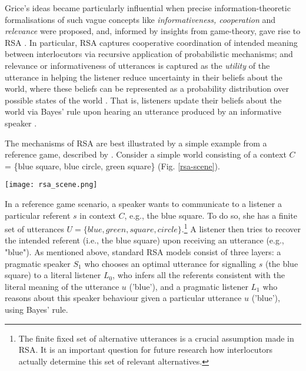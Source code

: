 Grice’s ideas became particularly influential when precise information-theoretic formalisations of such vague concepts like \emph{informativeness, cooperation} and \emph{relevance} were proposed, and, informed by insights from game-theory, gave rise to RSA \parencite{frank2012predicting}.
In particular, RSA captures cooperative coordination of intended meaning between interlocutors via recursive application of probabilistic mechanisms; and relevance or informativeness of utterances is captured as the \emph{utility} of the utterance in helping the listener reduce uncertainty in their beliefs about the world, where these beliefs can be represented as a probability distribution over possible states of the world \parencite[as advocated by e.g.][]{tenenbaum2011grow}.  
That is, listeners update their beliefs about the world via Bayes' rule upon hearing an utterance produced by an informative speaker \parencite{frank2012predicting}.

The mechanisms of RSA are best illustrated by a simple example from a reference game, described by \textcite{frank2012predicting}.
Consider a simple world consisting of a context $C$ = \{blue square, blue circle, green square\} (Fig. \ref{rsa-scene}).
\begin{figure*}[t]
	\begin{center}
		\texttt{[image: rsa\_scene.png]}
	\end{center}
	\vspace{-0.3cm}
	\caption{A simple reference resolution example scenario: the context $C$ consists of three possible referents \parencite{frank2012predicting}}
	\label{rsa-scene}
\end{figure*}
In a reference game scenario, a speaker wants to communicate to a listener a particular referent $s$ in context $C$, e.g., the blue square. To do so, she has a finite set of utterances $U = \{blue, green, square, circle\}$.\footnote{The finite fixed set of alternative utterances is a crucial assumption made in RSA. It is an important question for future research how interlocutors actually determine this set of relevant alternatives.} A listener then tries to recover the intended referent (i.e., the blue square) upon receiving an utterance (e.g., "blue"). 
As mentioned above, standard RSA models consist of three layers: a pragmatic speaker $S_1$ who chooses an optimal utterance for signalling $s$ (the blue square) to a literal listener $L_0$, who infers all the referents consistent with the literal meaning of the utterance $u$ ('blue'), and a pragmatic listener $L_1$ who reasons about this speaker behaviour given a particular utterance $u$ ('blue'), using Bayes' rule.

